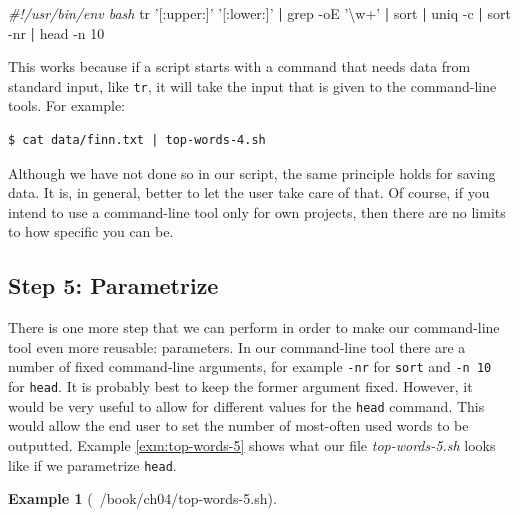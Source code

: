 \documentclass[
]{book}
\newenvironment{Shaded}{\begin{snugshade}}{\end{snugshade}}
\newcommand{\CommentTok}[1]{\textcolor[rgb]{0.56,0.35,0.01}{\textit{#1}}}
\newcommand{\FunctionTok}[1]{\textcolor[rgb]{0.00,0.00,0.00}{#1}}
\newcommand{\KeywordTok}[1]{\textcolor[rgb]{0.13,0.29,0.53}{\textbf{#1}}}
\newcommand{\NormalTok}[1]{#1}
\newcommand{\StringTok}[1]{\textcolor[rgb]{0.31,0.60,0.02}{#1}}
\theoremstyle{definition}
\theoremstyle{definition}
\newtheorem{example}{Example}[chapter]
\theoremstyle{definition}
\theoremstyle{remark}
\begin{document}
\begin{Shaded}
\begin{Highlighting}[]
\CommentTok{#!/usr/bin/env bash}
\FunctionTok{tr} \StringTok{'[:upper:]'} \StringTok{'[:lower:]'} \KeywordTok{|} \FunctionTok{grep}\NormalTok{ -oE }\StringTok{'\textbackslash{}w+'} \KeywordTok{|} \FunctionTok{sort} \KeywordTok{|}
\FunctionTok{uniq}\NormalTok{ -c }\KeywordTok{|} \FunctionTok{sort}\NormalTok{ -nr }\KeywordTok{|} \FunctionTok{head}\NormalTok{ -n 10}
\end{Highlighting}
\end{Shaded}

This works because if a script starts with a command that needs data from standard input, like \texttt{tr}, it will take the input that is given to the command-line tools. For example:

\begin{verbatim}
$ cat data/finn.txt | top-words-4.sh
\end{verbatim}

\begin{rmdtip}
Although we have not done so in our script, the same principle holds for saving data. It is, in general, better to let the user take care of that. Of course, if you intend to use a command-line tool only for own projects, then there are no limits to how specific you can be.
\end{rmdtip}

\hypertarget{step-5-parametrize}{%
\subsection{Step 5: Parametrize}\label{step-5-parametrize}}

There is one more step that we can perform in order to make our command-line tool even more reusable: parameters. In our command-line tool there are a number of fixed command-line arguments, for example \texttt{-nr} for \texttt{sort} and \texttt{-n\ 10} for \texttt{head}. It is probably best to keep the former argument fixed. However, it would be very useful to allow for different values for the \texttt{head} command. This would allow the end user to set the number of most-often used words to be outputted. Example \ref{exm:top-words-5} shows what our file \emph{top-words-5.sh} looks like if we parametrize \texttt{head}.

\begin{example}[~/book/ch04/top-words-5.sh]
\protect\hypertarget{exm:top-words-5}{}{\label{exm:top-words-5} {} }
\end{example}
\end{document}
